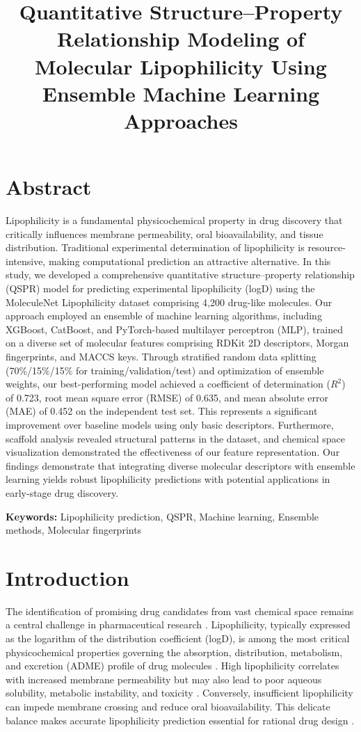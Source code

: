\documentclass[12pt,a4paper]{article}
\title{\textbf{Quantitative Structure--Property Relationship Modeling of Molecular Lipophilicity Using Ensemble Machine Learning Approaches}}
\author{}
\date{}
\begin{document}
\maketitle

\section*{Abstract}

Lipophilicity is a fundamental physicochemical property in drug discovery that critically influences membrane permeability, oral bioavailability, and tissue distribution. Traditional experimental determination of lipophilicity is resource-intensive, making computational prediction an attractive alternative. In this study, we developed a comprehensive quantitative structure--property relationship (QSPR) model for predicting experimental lipophilicity (logD) using the MoleculeNet Lipophilicity dataset comprising 4,200 drug-like molecules. Our approach employed an ensemble of machine learning algorithms, including XGBoost, CatBoost, and PyTorch-based multilayer perceptron (MLP), trained on a diverse set of molecular features comprising RDKit 2D descriptors, Morgan fingerprints, and MACCS keys. Through stratified random data splitting (70\%/15\%/15\% for training/validation/test) and optimization of ensemble weights, our best-performing model achieved a coefficient of determination ($R^2$) of 0.723, root mean square error (RMSE) of 0.635, and mean absolute error (MAE) of 0.452 on the independent test set. This represents a significant improvement over baseline models using only basic descriptors. Furthermore, scaffold analysis revealed structural patterns in the dataset, and chemical space visualization demonstrated the effectiveness of our feature representation. Our findings demonstrate that integrating diverse molecular descriptors with ensemble learning yields robust lipophilicity predictions with potential applications in early-stage drug discovery.

\textbf{Keywords:} Lipophilicity prediction, QSPR, Machine learning, Ensemble methods, Molecular fingerprints

\section{Introduction}

The identification of promising drug candidates from vast chemical space remains a central challenge in pharmaceutical research \citep{gaulton2017chembl}. Lipophilicity, typically expressed as the logarithm of the distribution coefficient (logD), is among the most critical physicochemical properties governing the absorption, distribution, metabolism, and excretion (ADME) profile of drug molecules \citep{richters2017logd}. High lipophilicity correlates with increased membrane permeability but may also lead to poor aqueous solubility, metabolic instability, and toxicity \citep{bickerton2012probing}. Conversely, insufficient lipophilicity can impede membrane crossing and reduce oral bioavailability. This delicate balance makes accurate lipophilicity prediction essential for rational drug design \citep{li2007prediction}.
\end{document}
